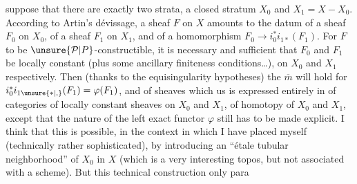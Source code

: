 %
suppose that there are exactly two strata, a closed stratum $X_0$ and $X_1=X-X_0$. According to Artin's dévissage, a sheaf $F$ on $X$ amounts to the datum of a sheaf $F_0$  on $X_0$, of a sheaf $F_1$  on $X_1$, and of a homomorphism $F_0\longrightarrow i_0^*i_{1*}(F_1)$. For $F$
\reversemarginpar
{}%
\normalmarginpar
to be $\unsure{\mathcal P|P}$-constructible, it is necessary and sufficient that $F_0$ and $F_1$ be locally constant (plus some ancillary finiteness conditions\ldots), on $X_0$ and $X_1$ respectively. Then (thanks to the equisingularity hypotheses) the $\overline m$ will hold for $i_0^*i_{1\unsure{*|,}}(F_1)=\varphi(F_1)$, and  of sheaves which  us is expressed entirely in   of categories of locally constant sheaves on $X_0$ and $X_1$,   of homotopy of $X_0$ and $X_1$, except that the nature of the left exact functor $\varphi$ still has to be made explicit. I think that this is possible, in the  context in which I have placed myself (technically rather sophisticated), by introducing an ``étale tubular neighborhood'' of $X_0$ in $X$ (which is a very interesting topos, but not associated with a scheme). But this technical construction only para%
